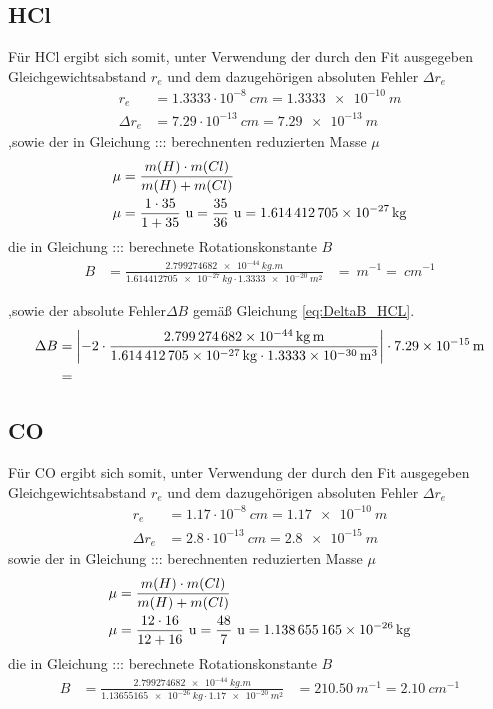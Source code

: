 \subsection*{HCl}
Für HCl ergibt sich somit, unter Verwendung der durch den Fit ausgegeben Gleichgewichtsabstand $r_e$ und dem dazugehörigen absoluten Fehler $\Delta r_e$
\begin{align}
\label{eq:re_HCL}
r_e &= 1.3333 \cdot 10^{-8} ~\si{cm}=\SI[mode=math]{1.3333e-10}{m}
\\
\Delta r_e &= 7.29 \cdot 10^{-13} ~\si{cm}=\SI[mode=math]{7.29e-13}{m}
\end{align}
,sowie der in Gleichung ::: berechnenten reduzierten Masse $\mu$
\begin{align}
\mu&= \frac{m(H)\cdot m(Cl)}{m(H)+m(Cl)}\notag\\
\mu&= \frac{1\cdot35}{1+35} ~\si{u}=\frac{35}{36}~\si{u}=\SI[mode=math]{1.614412705e-27}{kg}\label{eq:mu_HCL}
\end{align}
die in Gleichung ::: berechnete Rotationskonstante $B$
\begin{align}
\label{eq:B_HCL}
B &=\frac{\SI[mode=math]{2.799274682e-44}{kg.m}}{\SI[mode=math]{1.614412705e-27}{kg}\cdot\SI[mode=math]{1.3333e-20}{m^{2}}}
&=\SI[mode=math]{}{m^{-1}}
=\SI[mode=math]{}{cm^{-1}}
\end{align}


,sowie der absolute Fehler$\Delta B$  gemäß Gleichung  \ref{eq:DeltaB_HCL}.  
\begin{align}
\Delta B &= \left|-2\cdot \frac{\SI[mode=math]{2.799274682e-44}{kg.m}}{\SI[mode=math]{1.614412705e-27}{kg}\cdot\SI[mode=math]{1.3333e-30}{m^{3}}}\right| \cdot \SI[mode=math]{7.29e-15}{m}
\notag\\
&= \label{eq:DeltaB_HCL}
\end{align} 


\subsection*{CO}
Für CO ergibt sich somit, unter Verwendung der durch den Fit ausgegeben Gleichgewichtsabstand $r_e$ und dem dazugehörigen absoluten Fehler $\Delta r_e$
\begin{align}
\label{eq:r_CO}
r_e &= 1.17 \cdot 10^{-8} ~\si{cm}=\SI[mode=math]{1.17e-10}{m}
\\
\Delta r_e &= 2.8 \cdot 10^{-13} ~\si{cm}=\SI[mode=math]{2.8e-15}{m}
\end{align}
 sowie der in Gleichung ::: berechnenten reduzierten Masse $\mu$
\begin{align}
\mu&= \frac{m(H)\cdot m(Cl)}{m(H)+m(Cl)}\notag\\
\mu&= \frac{12\cdot16}{12+16} ~\si{u}=\frac{48}{7}~\si{u}=\SI[mode=math]{1.138655165e-26}{kg}\label{eq:mu_CO}
\end{align}
die in Gleichung ::: berechnete Rotationskonstante $B$
\begin{align}
\label{eq:B_CO}
B &=\frac{\SI[mode=math]{2.799274682e-44}{kg.m}}{\SI[mode=math]{1.13655165e-26}{kg}\cdot\SI[mode=math]{1.17e-20}{m^{2}}}
&=\SI[mode=math]{210.50}{m^{-1}}
=\SI[mode=math]{2.10}{cm^{-1}}
\end{align}


